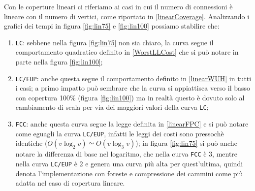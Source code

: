 Con le coperture lineari ci riferiamo ai casi in cui il numero di connessioni è lineare con il numero di vertici, come riportato in \eqref{linearCoverage}.
Analizzando i grafici dei tempi in figura \ref{fig:lin75} e \ref{fig:lin100} possiamo stabilire che:
\begin{enumerate}
    \item \texttt{LC}: sebbene nella figura \ref{fig:lin75} non sia chiaro, la curva segue il comportamento quadratico definito in \eqref{WorstLLCost}
          che si può notare in parte nella figura \ref{fig:lin100};
    \item \texttt{LC/EUP}: anche questa segue il comportamento definito in \eqref{linearWUH} in tutti i casi; a primo impatto può sembrare
          che la curva si appiattisca verso il basso con copertura 100\% (figura \ref{fig:lin100}) ma in realtà questo è dovuto solo al
          cambiamento di scala per via dei maggiori valori della curva \texttt{LC};
    \item \texttt{FCC}: anche questa curva segue la legge definita in \eqref{linearFPC} e si può notare come
          eguagli la curva \texttt{LC/EUP}, infatti le leggi dei costi sono pressochè identiche ($O(v\log_2v) \simeq O(v\log_3v)$); in figura
          \ref{fig:lin75} si può anche notare la differenza di base nel logaritmo, che nella curva \texttt{FCC} è 3, mentre nella curva
          \texttt{LC/EUP} è 2 e genera una curva più alta per quest'ultima, quindi denota l'implementazione con foreste e compressione
          dei cammini come più adatta nel caso di copertura lineare.
\end{enumerate}

